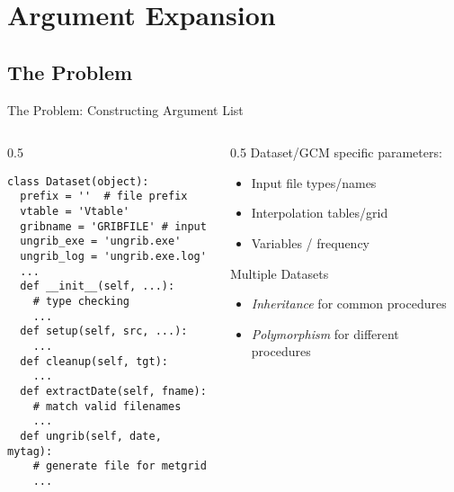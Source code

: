 \documentclass[hyperref={pdfpagelabels=false},compress,final]{beamer}
\newenvironment{myBox}[3][shadow=true]%
{\begin{center} \begin{minipage}{#2} \begin{beamerboxesrounded}[#1]{#3} \smallskip}%
      {\smallskip \end{beamerboxesrounded} \end{minipage} \end{center}}
\begin{document}


\section{Argument Expansion}


\subsection*{The Problem}

\begin{frame}[fragile=singleslide]{The Problem: Constructing Argument List}
  \begin{columns}
    \begin{column}{0.5\textwidth}
      \vspace*{-1.25cm}
      \begin{myBox}{1.0\textwidth}{}
        \footnotesize
        \begin{verbatim}
class Dataset(object):
  prefix = ''  # file prefix
  vtable = 'Vtable'
  gribname = 'GRIBFILE' # input
  ungrib_exe = 'ungrib.exe'
  ungrib_log = 'ungrib.exe.log'
  ...
  def __init__(self, ...):
    # type checking
    ...
  def setup(self, src, ...):
    ...
  def cleanup(self, tgt):
    ...
  def extractDate(self, fname):
    # match valid filenames
    ...
  def ungrib(self, date, mytag):
    # generate file for metgrid
    ...
        \end{verbatim}
      \end{myBox}
    \end{column}
    \begin{column}{0.5\textwidth}
      Dataset/GCM specific parameters: \smallskip
      \begin{itemize}
        \item Input file types/names\smallskip
        \item Interpolation tables/grid \smallskip
        \item Variables / frequency \smallskip
      \end{itemize}
        \begin{myBox}{0.9\textwidth}{Multiple Datasets}
          \begin{itemize}
            \item \textit{\color{purple} Inheritance} for common procedures \smallskip
            \item \textit{\color{teal} Polymorphism} for different procedures
          \end{itemize}
        \end{myBox}
    \end{column}
  \end{columns}
\end{frame}
\end{document}
